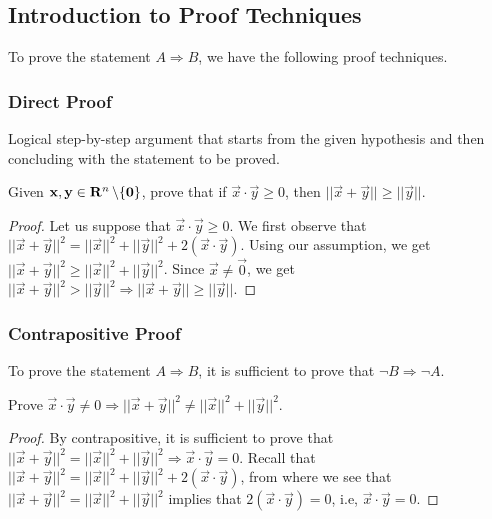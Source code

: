 \documentclass{article}
\begin{document}
\subsection{Introduction to Proof Techniques}

	To prove the statement $ A \Rightarrow B $, we have the following proof techniques.

	\subsubsection*{Direct Proof}
	
	Logical step-by-step argument that starts from the given hypothesis and then concluding with the statement to be proved. 
	
	\begin{eg}
		Given $ \mathbf{x}, \mathbf{y} \in \mathbf{R}^n \, \backslash \{ \mathbf{0} \} $, prove that if $ \vec{x} \cdot \vec{y} \geq 0 $, then $ ||\vec{x} + \vec{y}|| \geq ||\vec{y}|| $.
		
		\begin{proof}
			Let us suppose that $ \vec{x} \cdot \vec{y} \geq 0 $. We first observe that $ ||\vec{x} + \vec{y}||^2 = ||\vec{x}||^2 + ||\vec{y}||^2 + 2(\vec{x} \cdot \vec{y}) $. Using our assumption, we get $ ||\vec{x} + \vec{y}||^2 \geq ||\vec{x}||^2 + ||\vec{y}||^2 $. Since $ \vec{x} \neq \vec{0} $, we get $ ||\vec{x} + \vec{y}||^2 > ||\vec{y}||^2 \Rightarrow ||\vec{x} + \vec{y}|| \geq ||\vec{y}|| $.
		\end{proof}
	\end{eg}

	\subsubsection*{Contrapositive Proof}
	
	To prove the statement $ A \Rightarrow B $, it is sufficient to prove that $ \neg B \Rightarrow \neg A $.
	
	\begin{eg}
		Prove $ \vec{x} \cdot \vec{y} \neq 0 \Rightarrow ||\vec{x} + \vec{y}||^2 \neq ||\vec{x}||^2 + ||\vec{y}||^2 $.
		
		\begin{proof}
			By contrapositive, it is sufficient to prove that $ ||\vec{x} + \vec{y}||^2 = ||\vec{x}||^2 + ||\vec{y}||^2 \Rightarrow \vec{x} \cdot \vec{y} = 0 $. Recall that $ ||\vec{x} + \vec{y}||^2 = ||\vec{x}||^2 + ||\vec{y}||^2 + 2(\vec{x} \cdot \vec{y}) $, from where we see that $ ||\vec{x} + \vec{y}||^2 = ||\vec{x}||^2 + ||\vec{y}||^2 $ implies that $ 2(\vec{x} \cdot \vec{y}) = 0 $, i.e, $ \vec{x} \cdot \vec{y} = 0 $.
		\end{proof}
	\end{eg}
\end{document}
